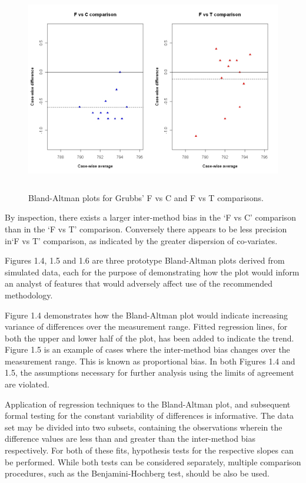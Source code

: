 \documentclass[12pt, a4paper]{report}
\begin{document}
\begin{figure}[h!]
\begin{center}
  \includegraphics[height=90mm]{GrubbsDataTwoBAplots.jpeg}
  \caption{Bland-Altman plots for Grubbs' F vs C and F vs T comparisons.}\label{GrubbsDataTwoBAplots}
\end{center}
\end{figure}

By inspection, there exists a larger inter-method bias in the `F
vs C' comparison than in the `F vs T' comparison. Conversely there
appears to be less precision in`F vs T' comparison, as indicated
by the greater dispersion of co-variates.

Figures 1.4, 1.5 and 1.6 are three prototype Bland-Altman plots
derived from simulated data, each for the purpose of demonstrating
how the plot would inform an analyst of features that would
adversely affect use of the recommended methodology.

Figure 1.4 demonstrates how the Bland-Altman plot would indicate
increasing variance of differences over the measurement range.
Fitted regression lines, for both the upper and lower half of the
plot, has been added to indicate the trend. Figure 1.5 is an
example of cases where the inter-method bias changes over the
measurement range. This is known as proportional bias. In both
Figures 1.4 and 1.5, the assumptions necessary for further
analysis using the limits of agreement are violated.

Application of regression techniques to the Bland-Altman plot, and
subsequent formal testing for the constant variability of
differences is informative. The data set may be divided into two
subsets, containing the observations wherein the difference values
are less than and greater than the inter-method bias respectively.
For both of these fits, hypothesis tests for the respective slopes
can be performed. While both tests can be considered separately,
multiple comparison procedures, such as the Benjamini-Hochberg
\citep{BH} test, should be also be used.
\end{document}
